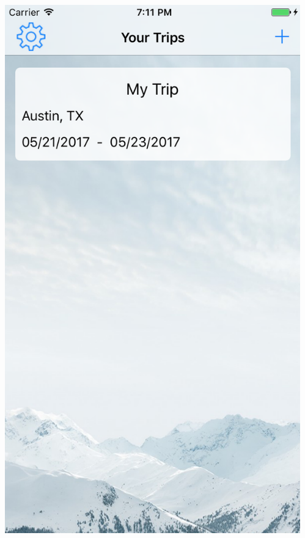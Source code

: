 \documentclass{beamer}
\begin{document}
\begin{frame}
\begin{columns}
\begin{column}{0.3\textwidth}
\begin{center}
        \end{center}
    \end{column}
    \begin{column}{0.3\textwidth}  %
        \begin{center}
            \includegraphics[scale=0.3]{trips}
        \end{center}
    \end{column}
\end{columns}
\end{frame}
\end{document}
